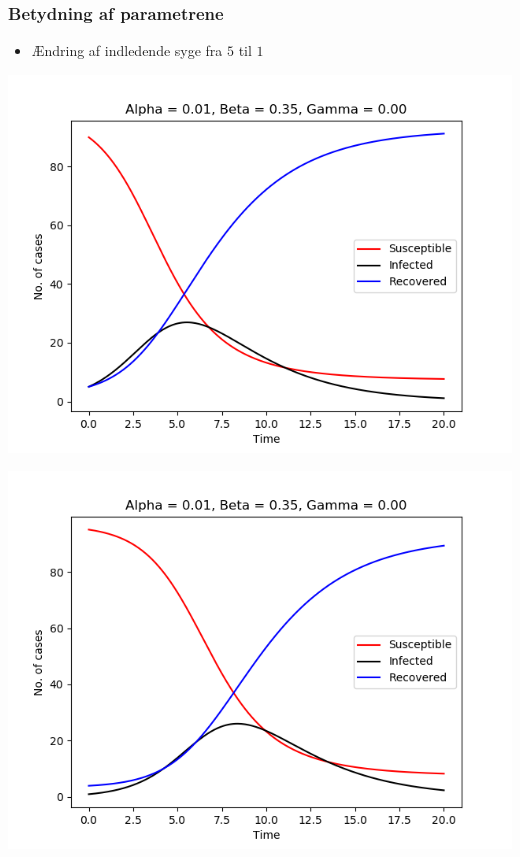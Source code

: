 \begin{frame}
\frametitle{Betydning af parametrene}
\begin{itemize}
\item Ændring af indledende syge fra $5$ til $1$
\end{itemize}

\begin{minipage}{0.49\textwidth}
\includegraphics[scale=0.3]{fig/img/t_a1_b35_g0.png}
\end{minipage}
%
\begin{minipage}{0.49\textwidth}
\includegraphics[scale=0.3]{fig/img/t_x1_1_x2_95.png}
\end{minipage}
\end{frame}
